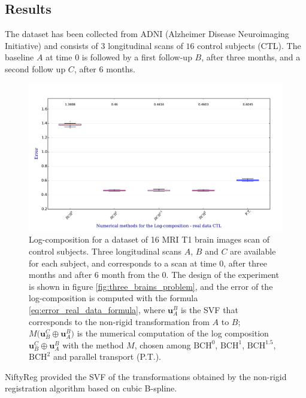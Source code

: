 \subsection{Results}

The dataset has been collected from ADNI (Alzheimer Disease Neuroimaging Initiative) \cite{jack2008alzheimer} and consists of $3$ longitudinal scans of $16$ control subjects (CTL).
The baseline $A$ at time $0$ is followed by a first follow-up $B$, after three months, and a second follow up $C$, after $6$ months.

\begin{figure}[!ht]
	\hspace{-1.0cm}
	\includegraphics[scale=0.5]{figures/svf_log_composition_boxplot_real_data_CTL.pdf}
	\caption{Log-composition for a dataset of 16 MRI T1 brain images scan of control subjects. Three longitudinal scans $A$, $B$ and $C$ are available for each subject, and corresponds to a scan at time $0$, after three months and after $6$ month from the $0$. The design of the experiment is shown in figure \ref{fig:three_brains_problem}, and the error of the log-composition is computed with the formula \ref{eq:error_real_data_formula}, where $\mathbf{u}_{A}^{B}$ is the SVF that corresponds to the non-rigid transformation from $A$ to $B$; $M\big(\mathbf{u}_{B}^{C} \oplus \mathbf{u}_{A}^{B} \big)$ is the numerical computation of the log composition $\mathbf{u}_{B}^{C} \oplus \mathbf{u}_{A}^{B}$ with the method $M$, chosen among $\text{BCH}^0$, $\text{BCH}^1$, $\text{BCH}^{1.5}$, $\text{BCH}^2$ and parallel transport (P.T.).}
	\label{fig:svf_log_composition_boxplot_real_data_CTL}
\end{figure}

NiftyReg provided the SVF of the transformations obtained by the non-rigid registration algorithm based on cubic B-spline. 

